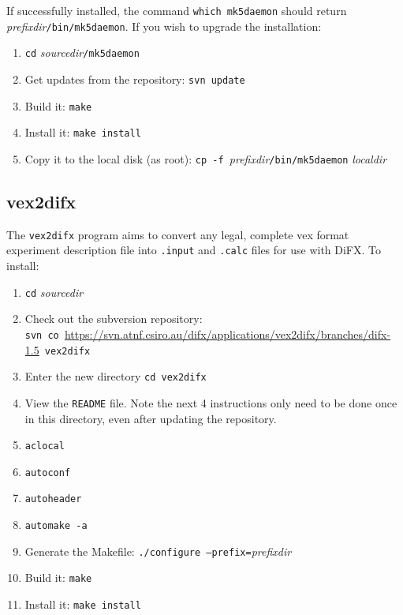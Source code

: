 If successfully installed, the command {\tt which mk5daemon} should return {\em prefixdir}{\tt /bin/mk5daemon}.
If you wish to upgrade the installation:
\begin{enumerate}
\item {\tt cd} {\em sourcedir}{\tt /mk5daemon}
\item Get updates from the repository: {\tt svn update}
\item Build it: {\tt make}
\item Install it: {\tt make install}
\item Copy it to the local disk (as root): {\tt cp -f }{\em prefixdir}{\tt /bin/mk5daemon} {\em localdir}
\end{enumerate}









\subsection{vex2difx}

\vspace{-20pt}\hspace{95pt}
\difxonefive

\vspace{7pt}

\noindent
The {\tt vex2difx} program aims to convert any legal, complete vex format experiment description file into {\tt .input} and {\tt .calc} files for use with DiFX.
To install:
\begin{enumerate}
\item {\tt cd} {\em sourcedir}
\item Check out the subversion repository: \\
{\tt svn co }\url{https://svn.atnf.csiro.au/difx/applications/vex2difx/branches/difx-1.5}{\tt\ vex2difx}
\item Enter the new directory {\tt cd vex2difx}
\item View the {\tt README} file.  
Note the next 4 instructions only need to be done once in this directory, even after updating the repository.
\item {\tt aclocal}
\item {\tt autoconf}
\item {\tt autoheader}
\item {\tt automake -a}
\item Generate the Makefile: {\tt ./configure --prefix=}{\em prefixdir}
\item Build it: {\tt make}
\item Install it: {\tt make install}
\end{enumerate}

